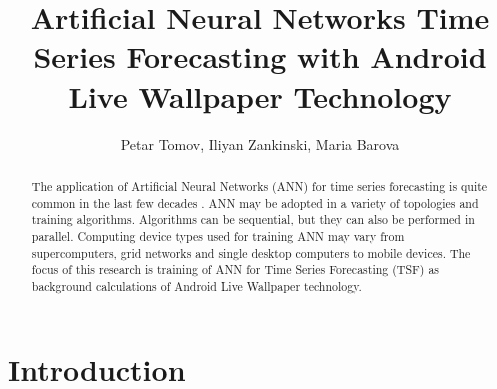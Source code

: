 ﻿\documentclass{llncs}
\begin{document}
\title{Artificial Neural Networks Time Series Forecasting with Android Live Wallpaper Technology} 

\author{Petar Tomov, Iliyan Zankinski, Maria Barova}



\maketitle


\begin{abstract}
The application of Artificial Neural Networks (ANN) for time series forecasting is quite common in the last few decades \cite{atanasova01}. ANN may be adopted in a variety of topologies and training algorithms. Algorithms can be sequential, but they can also be performed in parallel. Computing device types used for training ANN may vary from supercomputers, grid networks and single desktop computers to mobile devices. The focus of this research is training of ANN for Time Series Forecasting (TSF) as background calculations of Android Live Wallpaper technology. 

\end{abstract}


\section{Introduction}
\end{document}
